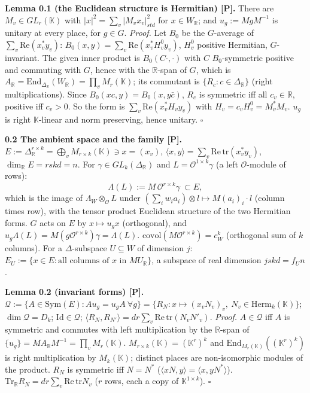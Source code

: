 \textbf{Lemma 0.1 (the Euclidean structure is Hermitian) {[}P{]}.} There are \(M_v\in GL_r(\mathbb K)\) with \(|x|^2=\sum_v|M_vx_v|^2_{std}\) for \(x\in W_{\mathbb R}\); and \(u_g:=MgM^{-1}\) is unitary at every place, for \(g\in G\).
\emph{Proof.} Let \(B_0\) be the \(G\)-average of \(\sum_v\mathrm{Re}(x_v^*y_v)\): \(B_0(x,y)=\sum_v\mathrm{Re}(x_v^*H^0_vy_v)\), \(H^0_v\) positive Hermitian, \(G\)-invariant. The given inner product is \(B_0(C\cdot,\cdot)\) with \(C\) \(B_0\)-symmetric positive and commuting with \(G\), hence with the \(\mathbb R\)-span of \(G\), which is \(A_{\mathbb R}=\mathrm{End}_{\Delta_{\mathbb R}}(W_{\mathbb R})=\prod_vM_r(\mathbb K)\); its commutant is \(\{R_c:c\in\Delta_{\mathbb R}\}\) (right multiplications). Since \(B_0(xc,y)=B_0(x,y\bar c)\), \(R_c\) is symmetric iff all \(c_v\in\mathbb R\), positive iff \(c_v>0\). So the form is \(\sum_v\mathrm{Re}(x_v^*H_vy_v)\) with \(H_v=c_vH_v^0=M_v^*M_v\). \(u_g\) is right \(\mathbb K\)-linear and norm preserving, hence unitary. \(\square\)

\textbf{0.2 The ambient space and the family {[}P{]}.} \(E:=\Delta_{\mathbb R}^{r\times k}=\bigoplus_vM_{r\times k}(\mathbb K)\ni x=(x_v)\), \(\langle x,y\rangle=\sum_v\mathrm{Re\,tr}(x_v^*y_v)\), \(\dim_{\mathbb R}E=rskd=n\). For \(\gamma\in GL_k(\Delta_{\mathbb R})\) and \(L=\mathcal O^{1\times k}\gamma\) (a left \(\mathcal O\)-module of rows):
\[\Lambda(L):=M\,\mathcal O^{r\times k}\gamma\ \subset E,\]
which is the image of \(\Lambda_W\otimes_{\mathcal O}L\) under \((\sum_iw_ia_i)\otimes l\mapsto M(a_i)_i\cdot l\) (column times row), with the tensor product Euclidean structure of the two Hermitian forms. \(G\) acts on \(E\) by \(x\mapsto u_gx\) (orthogonal), and \(u_g\Lambda(L)=M(g\mathcal O^{r\times k})\gamma=\Lambda(L)\). \(\mathrm{covol}(M\mathcal O^{r\times k})=c_W^k\) (orthogonal sum of \(k\) columns). For a \(\Delta\)-subspace \(U\subseteq W\) of dimension \(j\): \(E_U:=\{x\in E:\text{all columns of }x\text{ in }MU_{\mathbb R}\}\), a subspace of real dimension \(jskd=f_Un\).

\textbf{Lemma 0.2 (invariant forms) {[}P{]}.} \(\mathcal Q:=\{A\in\mathrm{Sym}(E):Au_g=u_gA\ \forall g\}=\{R_N:x\mapsto(x_vN_v)_v,\ N_v\in\mathrm{Herm}_k(\mathbb K)\}\); \(\dim\mathcal Q=D_k\); \(\mathrm{Id}\in\mathcal Q\); \(\langle R_N,R_{N'}\rangle=dr\sum_v\mathrm{Re\,tr}(N_vN'_v)\).
\emph{Proof.} \(A\in\mathcal Q\) iff \(A\) is symmetric and commutes with left multiplication by the \(\mathbb R\)-span of \(\{u_g\}=M A_{\mathbb R}M^{-1}=\prod_vM_r(\mathbb K)\). \(M_{r\times k}(\mathbb K)=(\mathbb K^r)^k\) and \(\mathrm{End}_{M_r(\mathbb K)}((\mathbb K^r)^k)\) is right multiplication by \(M_k(\mathbb K)\); distinct places are non-isomorphic modules of the product. \(R_N\) is symmetric iff \(N=N^*\) (\(\langle xN,y\rangle=\langle x,yN^*\rangle\)). \(\mathrm{Tr}_{\mathbb R}R_N=dr\sum_v\mathrm{Re\,tr}N_v\) (\(r\) rows, each a copy of \(\mathbb K^{1\times k}\)). \(\square\)

